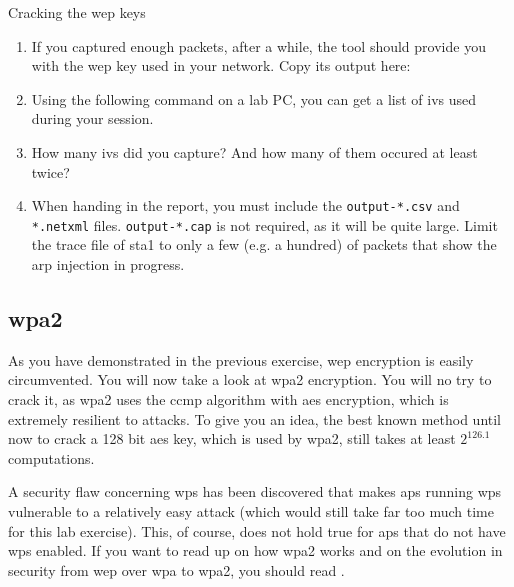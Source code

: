 \begin{exercise}{Cracking the \ac{wep} keys}
\begin{enumerate}
		\item If you captured enough packets, after a while, the  tool should provide you with the \ac{wep} key used in your network. Copy its output here:\newline
		\begin{esolution}
		\end{esolution}
		\item Using the following  command on a lab PC, you can get a list of \acp{iv} used during your session. \newline
		\item How many \acp{iv} did you capture? And how many of them occured at least twice?\newline
		\begin{esolution}
		\end{esolution}	
	\item When handing in the report, you must include the \texttt{output-*.csv} and \texttt{*.netxml} files. \texttt{output-*.cap} is not required, as it will be quite large. Limit the trace file of \ac{sta}1 to only a few (e.g. a hundred) of packets that show the \ac{arp} injection in progress.
	\end{enumerate} 
		
\end{exercise}

\subsection{\acs{wpa}2}

As you have demonstrated in the previous exercise, \ac{wep} encryption is easily circumvented. You will now take a look at \ac{wpa}2 encryption. You will no try to crack it, as \ac{wpa}2 uses the \ac{ccmp} algorithm with \ac{aes} encryption, which is extremely resilient to attacks. To give you an idea, the best known method until now to crack a 128 bit \ac{aes} key, which is used by \ac{wpa}2, still takes at least \( 2^{126.1} \) computations\cite{cryptoeprint:2011:449}.

A security flaw concerning \ac{wps} has been discovered that makes \acp{ap} running \ac{wps} vulnerable to a relatively easy attack (which would still take far too much time for this lab exercise)\cite{wps}. This, of course, does not hold true for \acp{ap} that do not have \ac{wps} enabled. If you want to read up on how \ac{wpa}2 works and on the evolution in security from \ac{wep} over \ac{wpa} to \ac{wpa}2, you should read \cite{wifisecurity:2012}.

